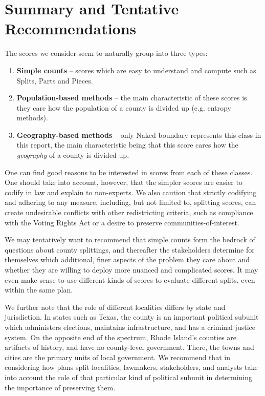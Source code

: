 \documentclass{mgggarticle}
\begin{document}
\section{Summary and Tentative Recommendations}
The scores we consider seem to naturally group into three types:
\begin{enumerate}
\item \textbf{Simple counts} -- scores which are easy to understand and compute such as Splits, Parts and Pieces.
\item \textbf{Population-based methods} -- the main characteristic of these scores is they care how the population of a county is divided up (e.g. entropy methods).
\item \textbf{Geography-based methods} -- only Naked boundary represents this class in this report, the main characteristic being that this score cares how the \emph{geography} of a county is divided up.
\end{enumerate}

One can find good reasons to be interested in scores from each of these classes. One should take into account, however, that the simpler scores are easier to codify in law and explain to non-experts. We also caution that strictly codifying and adhering to any measure, including, but not limited to, splitting scores, can create undesirable conflicts with other redistricting criteria, such as compliance with the Voting Rights Act or a desire to preserve communities-of-interest.

We may tentatively want to recommend that simple counts form the bedrock of questions about county splittings, and thereafter the stakeholders determine for themselves which additional, finer aspects of the problem they care about and whether they are willing to deploy more nuanced and complicated scores.  It may even make sense to use different kinds of scores to evaluate different splits, even within the same plan.

We further note that the role of different localities differs by state and jurisdiction.  In states such as Texas, the county is an important political subunit which administers elections, maintains infrastructure, and has a criminal justice system.  On the opposite end of the spectrum, Rhode Island's counties are artifacts of history, and have no county-level government.  There, the towns and cities are the primary units of local government.  We recommend that in considering how plans split localities, lawmakers, stakeholders, and analysts take into account the role of that particular kind of political subunit in determining the importance of preserving them.
\end{document}
